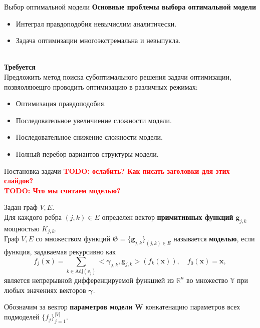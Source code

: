 \documentclass[usenames,dvipsnames,11pt,pdf,utf8,russian,aspectratio=169]{beamer}
\begin{document}
\begin{frame}{Выбор оптимальной модели}
\textbf{Основные проблемы выбора оптимальной модели}\\
\begin{itemize}
\item Интеграл правдоподобия невычислим аналитически.
\item Задача оптимизации многоэкстремальна и невыпукла.
\end{itemize}
~\\
\textbf{Требуется}\\ 
Предложить метод поиска субоптимального решения задачи оптимизации, позвяоляюещго проводить оптимизацию в различных режимах:
\begin{itemize}
\item Оптимизация правдоподобия.
\item Последовательное увеличиение сложности модели.
\item Последовательное снижение сложности модели.
\item Полный перебор вариантов структуры модели.
\end{itemize}

\end{frame}       



\begin{frame}{ Постановка задачи}
\textcolor{red}{\textbf{TODO: ослабить? Как писать заголовки для этих слайдов?\\}}
\textcolor{red}{\textbf{TODO: Что мы считаем моделью?\\}}

Задан граф $V,E$. \\
Для каждого ребра $(j,k) \in E$ определен вектор \textbf{примитивных функций} $\mathbf{g}_{j,k}$ мощностью $K_{j,k}$.\\
Граф $V, E$ со множеством функций $\mathfrak{G} = \{\mathbf{g}_{j,k}\}_{(j,k) \in E}$ называется \textbf{моделью}, если функция, задаваемая рекурсивно как 
\[
    f_j(\mathbf{x}) = \sum_{k \in \text{Adj}(v_j)} <\boldsymbol{\gamma}_{j,k}, \mathbf{g}_{j,k}> (f_{k}(\mathbf{x})), \quad     f_0(\mathbf{x}) = \mathbf{x},
\]
является непрерывной дифференцируемой функцией из $\mathbb{R}^n$ во множество $\mathbb{Y}$ при любых значениях векторов $\boldsymbol{\gamma}$.

Обозначим за вектор \textbf{параметров модели}  $\mathbf{W}$ конкатенацию параметров всех подмоделей $\{f_j\}_{j=1}^{|V|}$.
\end{frame}
\end{document}
